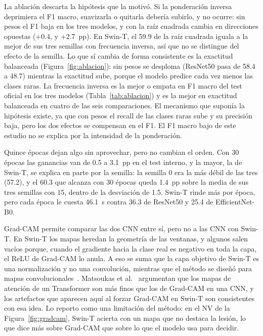 \documentclass[conference]{IEEEtran}
\begin{document}
La ablación descarta la hipótesis que la motivó. Si la ponderación inversa deprimiera el F1 macro, suavizarla o quitarla debería subirlo, y no ocurre: sin pesos el F1 baja en los tres modelos, y con la raíz cuadrada cambia en direcciones opuestas (+0.4,  y +2.7~pp). En Swin-T, el 59.9 de la raíz cuadrada iguala a la mejor de sus tres semillas con frecuencia inversa, así que no se distingue del efecto de la semilla. Lo que sí cambia de forma consistente es la exactitud balanceada (Figura~\ref{fig:ablacion}): sin pesos se desploma (ResNet50 pasa de 58.4 a 48.7) mientras la exactitud sube, porque el modelo predice cada vez menos las clases raras. La frecuencia inversa es la mejor o empata en F1 macro del test oficial en los tres modelos (Tabla~\ref{tab:ablacion}) y es la mejor en exactitud balanceada en cuatro de las seis comparaciones. El mecanismo que suponía la hipótesis existe, ya que con pesos el recall de las clases raras sube y su precisión baja, pero los dos efectos se compensan en el F1. El F1 macro bajo de este estudio no se explica por la intensidad de la ponderación.

Quince épocas dejan algo sin aprovechar, pero no cambian el orden. Con 30 épocas las ganancias van de 0.5 a 3.1~pp en el test interno, y la mayor, la de Swin-T, se explica en parte por la semilla: la semilla 0 era la más débil de las tres (57.2), y el 60.3 que alcanza con 30 épocas queda 1.4~pp sobre la media de sus tres semillas con 15, dentro de la desviación de 1.5. Swin-T rinde más por época, pero cada época le cuesta 46.1~s contra 36.3 de ResNet50 y 25.4 de EfficientNet-B0.

Grad-CAM permite comparar las dos CNN entre sí, pero no a las CNN con Swin-T. En Swin-T los mapas heredan la geometría de las ventanas, y algunos salen vacíos porque, cuando el gradiente hacia la clase real es negativo en toda la capa, el ReLU de Grad-CAM lo anula. A eso se suma que la capa objetivo de Swin-T es una normalización y no una convolución, mientras que el método se diseñó para mapas convolucionales~\cite{selvaraju2017gradcam}. Matsoukas et al.~\cite{matsoukas2021replace} argumentan que los mapas de atención de un Transformer son más finos que los de Grad-CAM en una CNN, y los artefactos que aparecen aquí al forzar Grad-CAM en Swin-T son consistentes con esa idea. Lo reporto como una limitación del método: en el NV de la Figura~\ref{fig:gradcam}, Swin-T acierta con un mapa que no destaca la lesión, lo que dice más sobre Grad-CAM que sobre lo que el modelo usa para decidir.
\end{document}
